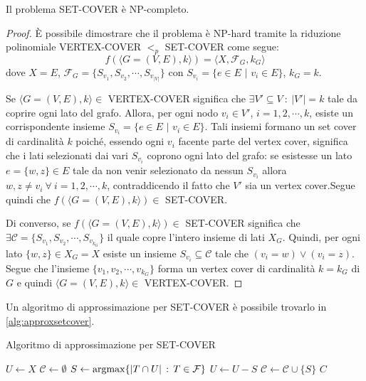 \begin{proposizione}
Il problema SET-COVER è NP-completo.
\end{proposizione}
\begin{proof}
È possibile dimostrare che il problema è NP-hard tramite la riduzione polinomiale VERTEX-COVER $<_p$ SET-COVER come segue:
\[
f(\langle G=(V,E), k \rangle) = \langle X, \mathcal{F}_G, k_G \rangle
\]
dove $X=E$, $\mathcal{F}_G = \{S_{v_1}, S_{v_2}, \cdots, S_{v_{|V|}}\}$ con $S_{v_i} = \{e\in E \,\, | \,\, v_i\in E\}$, $k_G = k$.

Se $\langle G=(V,E), k \rangle \in$ VERTEX-COVER significa che $\exists V'\subseteq V\ :\ |V'|=k$ tale da coprire ogni lato del grafo. Allora, per ogni nodo $v_i\in V'$, $i=1, 2, \cdots, k$, esiste un corrispondente insieme $S_{v_i} = \{e\in E \,\, | \,\, v_i\in E\}$. Tali insiemi formano un set cover di cardinalità $k$ poiché, essendo ogni $v_i$ facente parte del vertex cover, significa che i lati selezionati dai vari $S_{v_i}$ coprono ogni lato del grafo: se esistesse un lato $e=\{w,z\}\in E$ tale da non venir selezionato da nessun $S_{v_i}$ allora $w,z\neq v_i\ \forall\ i=1, 2, \cdots, k$, contraddicendo il fatto che $V'$ sia un vertex cover.Segue quindi che $f(\langle G=(V,E), k \rangle)\in$ SET-COVER.

Di converso, se $f(\langle G=(V,E), k \rangle)\in$ SET-COVER significa che $\exists \mathcal{C} = \{S_{v_1}, S_{v_2}, \cdots, S_{v_{k_G}}\}$ il quale copre l'intero insieme di lati $X_G$. Quindi, per ogni lato $\{w,z\}\in X_G = X$ esiste un insieme $S_{v_i}\subseteq \mathcal{C}$ tale che $(v_i = w) \lor (v_i = z)$. Segue che l'insieme $\{v_1, v_2, \cdots, v_{k_G}\}$ forma un vertex cover di cardinalità $k=k_G$ di $G$ e quindi $\langle G=(V,E), k \rangle\in$ VERTEX-COVER.
\end{proof}


Un algoritmo di approssimazione per SET-COVER è possibile trovarlo in \ref{alg:approxsetcover}.
\begin{algorithm}
\caption{Algoritmo di approssimazione per SET-COVER}
\label{alg:approxsetcover}
\begin{algorithmic}
	\State $U \gets X$
	\State $\mathcal{C} \gets \emptyset$
		\State $S \gets \operatorname*{argmax}\{|T\cap U|\,:\,T\in\mathcal{F}\}$
		\State $U \gets U-S$
		\State $\mathcal{C} \gets \mathcal{C} \cup \{S\}$
	\EndWhile
	\State \Return $C$
\EndFunction
\end{algorithmic}
\end{algorithm}

